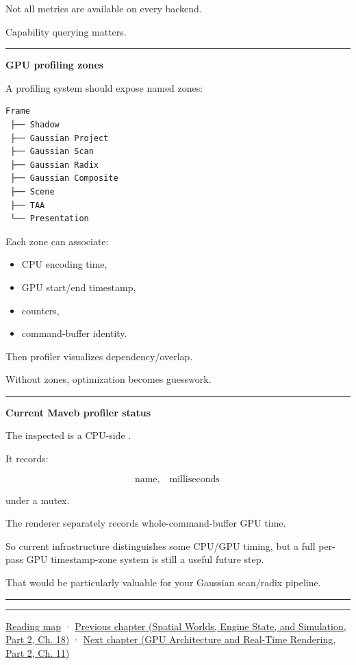 Not all metrics are available on every backend.

Capability querying matters.

\begin{center}\rule{0.5\linewidth}{0.5pt}\end{center}

\textbf{GPU profiling zones}

A profiling system should expose named zones:

\protect{}\label{p10-zones}%
\begin{verbatim}
Frame
 ├── Shadow
 ├── Gaussian Project
 ├── Gaussian Scan
 ├── Gaussian Radix
 ├── Gaussian Composite
 ├── Scene
 ├── TAA
 └── Presentation
\end{verbatim}

Each zone can associate:

\begin{itemize}
\tightlist
\item
  CPU encoding time,
\item
  GPU start/end timestamp,
\item
  counters,
\item
  command-buffer identity.
\end{itemize}

Then profiler visualizes dependency/overlap.

Without zones, optimization becomes guesswork.

\begin{center}\rule{0.5\linewidth}{0.5pt}\end{center}

\textbf{Current Maveb profiler status}

The inspected  is a CPU-side .

It records:

\[
\text{name},
\quad
\text{milliseconds}
\]

under a mutex.

The renderer separately records whole-command-buffer GPU time.

So current infrastructure distinguishes some CPU/GPU timing, but a full per-pass GPU timestamp-zone system is still a useful future step.

That would be particularly valuable for your Gaussian scan/radix pipeline.

\begin{center}\rule{0.5\linewidth}{0.5pt}\end{center}

\begin{center}\rule{0.5\linewidth}{0.5pt}\end{center}

\hyperref[volume-reading-map]{Reading map} · \href{../05-Spatial-Worlds-Engine-State-and-Simulation-P02/main.pdf\#nameddest=05-engine-i-ch018-ecs-contracts-diagnostics-and-gpu-handoff}{Previous chapter (Spatial Worlds, Engine State, and Simulation, Part 2, Ch. 18)} · \href{../06-GPU-Architecture-and-Real-Time-Rendering-P02/main.pdf\#nameddest=05-engine-i-ch020-gpu-performance-models-and-principled-redesign}{Next chapter (GPU Architecture and Real-Time Rendering, Part 2, Ch. 11)}
